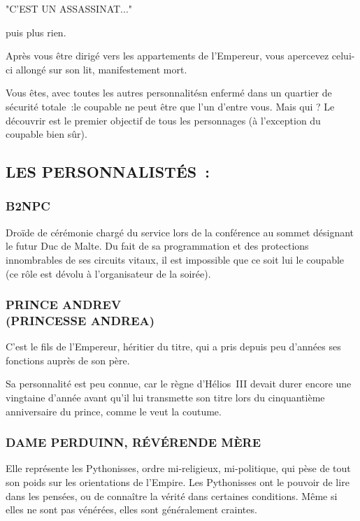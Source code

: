 \documentclass[14pt,twocolumn]{extarticle}
\begin{document}
"C'EST UN ASSASSINAT..."

puis plus rien.

Après vous être dirigé vers les appartements de l'Empereur, vous apercevez
celui-ci allongé sur son lit, manifestement mort.

Vous êtes, avec toutes les autres personnalitésn enfermé dans un quartier de
sécurité totale~:le coupable ne peut être que l'un d'entre vous. Mais qui ?
Le découvrir est le premier objectif de tous les personnages (à l'exception du
coupable bien sûr).

\clearpage

\subsection{LES PERSONNALISTÉS~:}

\subsubsection{B2NPC}

Droïde de cérémonie chargé du service lors de la conférence au sommet désignant
le futur Duc de Malte. Du fait de sa programmation et des protections
innombrables de ses circuits vitaux, il est impossible que ce soit lui le
coupable (ce rôle est dévolu à l'organisateur de la soirée).

\subsubsection{PRINCE ANDREV\\(PRINCESSE ANDREA)}

C'est le fils de l'Empereur, héritier du titre, qui a pris depuis peu d'années
ses fonctions auprès de son père.

Sa personnalité est peu connue, car le règne d'Hélios~III devait durer
encore une vingtaine d'année avant qu'il lui transmette son titre lors du
cinquantième anniversaire du prince, comme le veut la coutume.

\subsubsection{DAME PERDUINN, RÉVÉRENDE MÈRE}

Elle représente les Pythonisses, ordre mi-religieux, mi-politique, qui pèse de
tout son poids sur les orientations de l'Empire. Les Pythonisses ont le pouvoir
de lire dans les pensées, ou de connaître la vérité dans certaines conditions.
Même si elles ne sont pas vénérées, elles sont généralement craintes.
\end{document}
